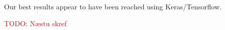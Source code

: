 \documentclass[a4paper]{article}
\newcommand\todo[1]{\textcolor{red}{TODO: #1}}
\begin{document}
Our best results appear to have been reached using Keras/Tensorflow.

\todo{Næstu skref}


\appendix
\setlength{\voffset}{0cm}
\setlength{\hoffset}{0cm}



\setlength{\voffset}{-2.54cm}
\setlength{\hoffset}{-2.54cm}

\end{document}
